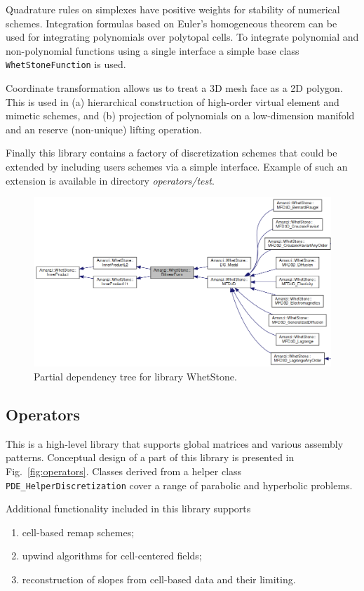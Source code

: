 Quadrature rules on simplexes have positive weights for stability of numerical schemes. 
Integration formulas based on Euler's homogeneous theorem can be used for integrating
polynomials over polytopal cells.
To integrate polynomial and non-polynomial functions using a single interface a simple
base class {\tt WhetStoneFunction} is used.

Coordinate transformation allows us to treat a 3D mesh face as a 2D polygon.
This is used in (a) hierarchical construction of high-order virtual element and mimetic 
schemes, and (b) projection of polynomials on a low-dimension manifold and an reserve (non-unique)
lifting operation.

Finally this library contains a factory of discretization schemes that could
be extended by including users schemes via a simple interface.
Example of such an extension is available in directory {\it operators/test}.


\begin{figure}[h!]
\includegraphics[width=1.0\textwidth]{figs/whetstone.png}
\caption{Partial dependency tree for library WhetStone.\label{fig:whetstone}}
\end{figure}


\clearpage
\subsection{Operators}
This is a high-level library that supports global matrices and
various assembly patterns.
Conceptual design of a part of this library is presented in Fig.~\ref{fig:operators}.
Classes derived from a helper class {\tt PDE\_HelperDiscretization} cover 
a range of parabolic and hyperbolic problems.

Additional functionality included in this library supports
\begin{enumerate}
\item cell-based remap schemes;
\item upwind algorithms for cell-centered fields;
\item reconstruction of slopes from cell-based data and their limiting.
\end{enumerate}


